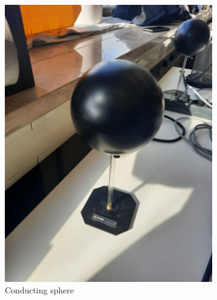 \begin{figure}[H]
    \begin{subfigure}[b]{0.33\textwidth}
        \centering
        \includegraphics[width=\textwidth]{capacitors/img/setup/conducting_sphere.jpg}
        \caption{Conducting sphere}
    \end{subfigure}
    \begin{subfigure}[b]{0.33\textwidth}
        \centering

\end{subfigure}
\end{figure}
